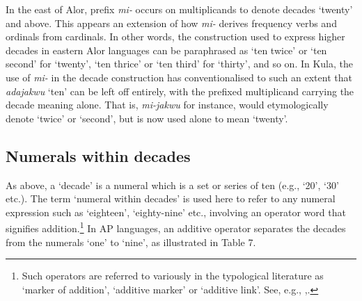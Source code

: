 {In the east of Alor, prefix \textit{mi-} occurs on multiplicands to denote decades `twenty' and above. This appears an extension of how \textit{mi-}\textsc{} derives frequency verbs and ordinals from cardinals. In other words, the construction used to express higher decades in eastern Alor languages can be paraphrased as `ten twice' or `ten second' for `twenty', `ten thrice' or `ten third' for `thirty', and so on. In Kula, the use of \textit{mi-} in the decade construction has conventionalised to such an extent that \textit{adajakwu} `ten' can be left off entirely, with the prefixed multiplicand carrying the decade meaning alone. That is, \textit{mi-jakwu} for instance, would etymologically denote `twice' or `second', but is now used alone to mean `twenty'.

\subsection{Numerals within decades}
As above, a `decade' is a numeral which is a set or series of ten (e.g., `20', `30' etc.). The term `numeral within decades' is used here to refer to any numeral expression such as `eighteen', `eighty-nine' etc., involving an operator word that signifies addition.\footnote{{}   Such operators are referred to variously in the typological literature as `marker of addition', `additive marker' or `additive link'. See, e.g., \citet[264-265]{Greenberg1978},\citet[73]{Hanke2010}.} In AP languages, an additive operator separates the decades from the numerals `one' to `nine', as illustrated in Table 7.



\begin{table}



\end{table}}
